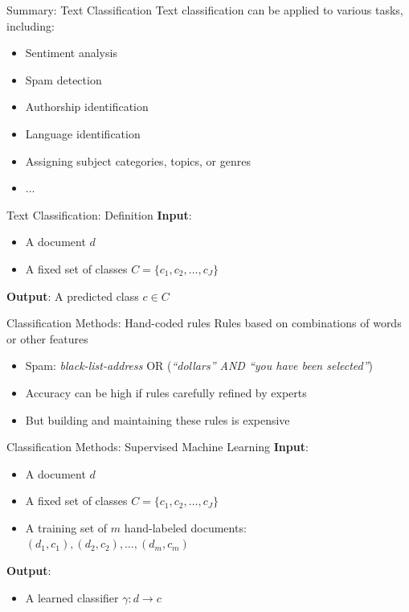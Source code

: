 \documentclass[handout]{beamer}
\begin{document}
\begin{frame}{Summary: Text Classification}
    Text classification can be applied to various tasks, including:
    \begin{itemize}
        \item Sentiment analysis
        \item Spam detection
        \item Authorship identification
        \item Language identification
        \item Assigning subject categories, topics, or genres
        \item ...
    \end{itemize}
\end{frame}

\begin{frame}{Text Classification: Definition}
    \textbf{Input}:
    \begin{itemize}
        \item A document $d$
        \item A fixed set of classes $C = \{c_1, c_2, \ldots, c_J\}$
    \end{itemize}
    
    \textbf{Output}: A predicted class $c \in C$
\end{frame}

\begin{frame}{Classification Methods: Hand-coded rules}
    Rules based on combinations of words or other features
    \begin{itemize}
        \item Spam: \textit{black-list-address} OR (\textit{“dollars” AND “you have been selected”})
        \item Accuracy can be high if rules carefully refined by experts
        \item But building and maintaining these rules is expensive
    \end{itemize}
\end{frame}

\begin{frame}{Classification Methods: Supervised Machine Learning}
    \textbf{Input}:
    \begin{itemize}
        \item A document $d$
        \item A fixed set of classes $C = \{c_1, c_2, \ldots, c_J\}$
        \item A training set of $m$ hand-labeled documents: $(d_1, c_1), (d_2, c_2), \ldots, (d_m, c_m)$
    \end{itemize}
    
    \textbf{Output}:
    \begin{itemize}
        \item A learned classifier $\gamma: d \to c$
    \end{itemize}
\end{frame}
\end{document}
